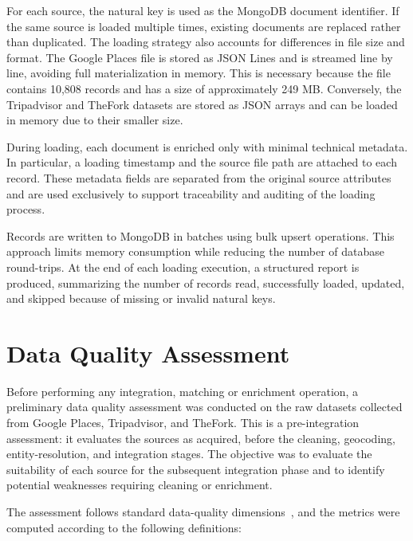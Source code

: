 For each source, the natural key is used as the MongoDB document identifier. If the same source is loaded multiple times, existing documents are replaced rather than duplicated. 
The loading strategy also accounts for differences in file size and format. The Google Places file is stored as JSON Lines and is streamed line by line, avoiding full materialization in memory. This is necessary because the file contains 10,808 records and has a size of approximately 249 MB. Conversely, the Tripadvisor and TheFork datasets are stored as JSON arrays and can be loaded in memory due to their smaller size.

During loading, each document is enriched only with minimal technical metadata. In particular, a loading timestamp and the source file path are attached to each record. These metadata fields are separated from the original source attributes and are used exclusively to support traceability and auditing of the loading process.

Records are written to MongoDB in batches using bulk upsert operations. This approach limits memory consumption while reducing the number of database round-trips. At the end of each loading execution, a structured report is produced, summarizing the number of records read, successfully loaded, updated, and skipped because of missing or invalid natural keys.

\section{Data Quality Assessment}
\label{sec:pre-integration-quality}

Before performing any integration, matching or enrichment operation, a preliminary data quality assessment was conducted on the raw datasets collected from Google Places, Tripadvisor, and TheFork. This is a pre-integration assessment: it evaluates the sources as acquired, before the cleaning, geocoding, entity-resolution, and integration stages. The objective was to evaluate the suitability of each source for the subsequent integration phase and to identify potential weaknesses requiring cleaning or enrichment.

The assessment follows standard data-quality dimensions~\cite{batini-scannapieco-2016}, and the metrics were computed according to the following definitions:

